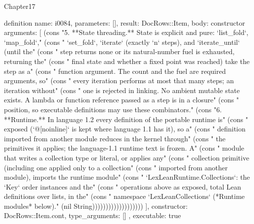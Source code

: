 \begin{lexlean}{Chapter17}
\begin{semanticmodule}
definition{
  name: i0084,
  parameters: [],
  result: DocRows::Item,
  body: constructor{
    arguments: [
      (cons "5. **State threading.** State is explicit and pure: `list_fold`, `map_fold`," (cons "   `set_fold`, `iterate` (exactly `n` steps), and `iterate_until` (until the" (cons "   step returns none or its natural-number fuel is exhausted, returning the" (cons "   final state and whether a fixed point was reached) take the step as a" (cons "   function argument. The count and the fuel are required arguments, so" (cons "   every iteration performs at most that many steps; an iteration without" (cons "   one is rejected in linking. No ambient mutable state exists. A lambda or function reference passed as a step is in a closure" (cons "   position, so executable definitions may use these combinators." (cons "6. **Runtime.** In language 1.2 every definition of the portable runtime is" (cons "   exposed (`@[noinline]` is kept where language 1.1 has it), so a" (cons "   definition imported from another module reduces in the kernel through" (cons "   the primitives it applies; the language-1.1 runtime text is frozen. A" (cons "   module that writes a collection type or literal, or applies any" (cons "   collection primitive (including one applied only to a collection" (cons "   imported from another module), imports the runtime module" (cons "   `LexLeanRuntime.Collections`: the `Key` order instances and the" (cons "   operations above as exposed, total Lean definitions over lists, in the" (cons "   namespace `LexLeanCollections` (*Runtime modules* below)." (nil String)))))))))))))))))))
    ],
    constructor: DocRows::Item.cont,
    type_arguments: []
  },
  executable: true
}


\end{semanticmodule}
\end{lexlean}
